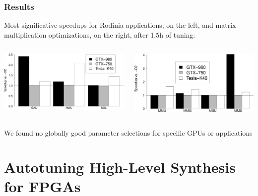 \documentclass[10pt, compress, aspectratio=169]{beamer}
\begin{document}
\begin{frame}
    \frametitle{Results}
    \alert{Most significative speedups} for \alert{Rodinia applications}, on the left,
    and \alert{matrix multiplication optimizations}, on the right, after \alert{1.5h of tuning}:
    \begin{columns}[T,onlytextwidth]
        \vspace{0.57cm}
        \begin{center}
            \includegraphics[width=.9\textwidth]{RodiniaSummary}
        \end{center}

        \begin{center}
            \includegraphics[width=.9\textwidth]{MatrixSummary}
        \end{center}

    \end{columns}
    We \alert{found no globally good parameter selections} for specific GPUs or applications
\end{frame}

\section{Autotuning High-Level Synthesis for FPGAs}
\end{document}
